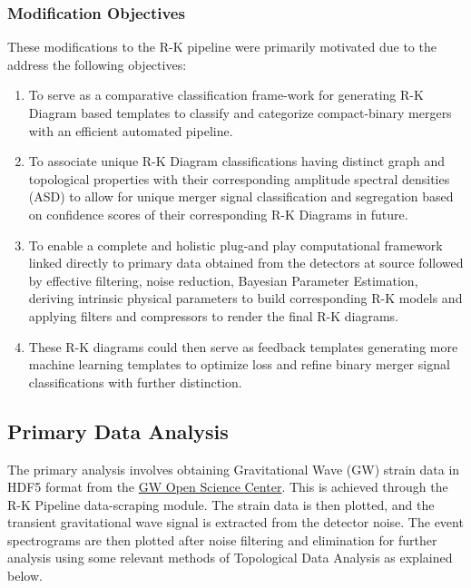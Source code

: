    \subsubsection{Modification Objectives}
    These modifications to the R-K pipeline were primarily motivated due to the address the following objectives:
    \begin{enumerate}
        \item To serve as a comparative classification frame-work for generating R-K Diagram based templates to classify and categorize compact-binary mergers with an efficient automated pipeline.
        \item To associate unique R-K Diagram classifications having distinct graph and topological properties with their  corresponding amplitude spectral densities (ASD) to allow for unique merger signal classification and segregation based on confidence scores of their corresponding R-K Diagrams in future.
        \item To enable a complete and holistic plug-and play computational framework linked directly to  primary data obtained from the detectors at source followed by effective filtering, noise reduction, Bayesian Parameter Estimation, deriving intrinsic physical parameters to build corresponding R-K models and applying filters and compressors to render the final R-K diagrams.
        \item These R-K diagrams could then serve as feedback templates generating more machine learning templates to optimize loss and refine binary merger signal classifications with further distinction.
    \end{enumerate}

    \subsection{Primary Data Analysis}

The primary analysis involves obtaining Gravitational Wave (GW) strain data in HDF5 format from the  \href{https://gwosc.org/data/}{GW Open Science Center}. This is achieved through the R-K Pipeline data-scraping module. The strain data is then plotted, and the transient gravitational wave signal is extracted from the detector noise. The event spectrograms are then plotted after noise filtering and elimination for further analysis using some relevant methods of Topological Data Analysis as explained below. \cite{00_LIGOOpenSciData} \cite{02.4_TDAResearch} \cite{02_carlsson2009topology}

